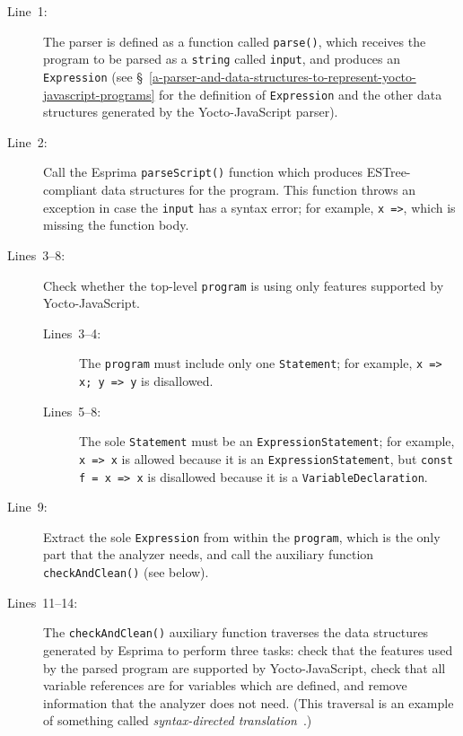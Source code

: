 \documentclass[12pt, oneside]{book}
\begin{document}
\begin{description}
\item [Line~1:]

The parser is defined as a function called \texttt{parse()}, which receives the program to be parsed as a \texttt{string} called \texttt{input}, and produces an \texttt{Expression} (see §~\ref{a-parser-and-data-structures-to-represent-yocto-javascript-programs} for the definition of \texttt{Expression} and the other data structures generated by the Yocto-JavaScript parser).

\item [Line~2:]

Call the Esprima \texttt{parseScript()} function which produces ESTree-compliant data structures for the program. This function throws an exception in case the \texttt{input} has a syntax error; for example, \texttt{x =>}, which is missing the function body.

\item [Lines~3–8:]

Check whether the top-level \texttt{program} is using only features supported by Yocto-JavaScript.

\begin{description}
\item [Lines~3–4:]

The \texttt{program} must include only one \texttt{Statement}; for example, \texttt{x => x; y => y} is disallowed.

\item [Lines~5–8:]

The sole \texttt{Statement} must be an \texttt{ExpressionStatement}; for example, \texttt{x => x} is allowed because it is an \texttt{ExpressionStatement}, but \texttt{const f = x => x} is disallowed because it is a \texttt{VariableDeclaration}.
\end{description}

\item [Line~9:]

Extract the sole \texttt{Expression} from within the \texttt{program}, which is the only part that the analyzer needs, and call the auxiliary function \texttt{checkAndClean()} (see below).

\item [Lines~11–14:]

The \texttt{checkAndClean()} auxiliary function traverses the data structures generated by Esprima to perform three tasks: check that the features used by the parsed program are supported by Yocto-JavaScript, check that all variable references are for variables which are defined, and remove information that the analyzer does not need. (This traversal is an example of something called \emph{syntax-directed translation}~\cite[§~2]{dragon-book}.)


\end{description}
\end{document}
